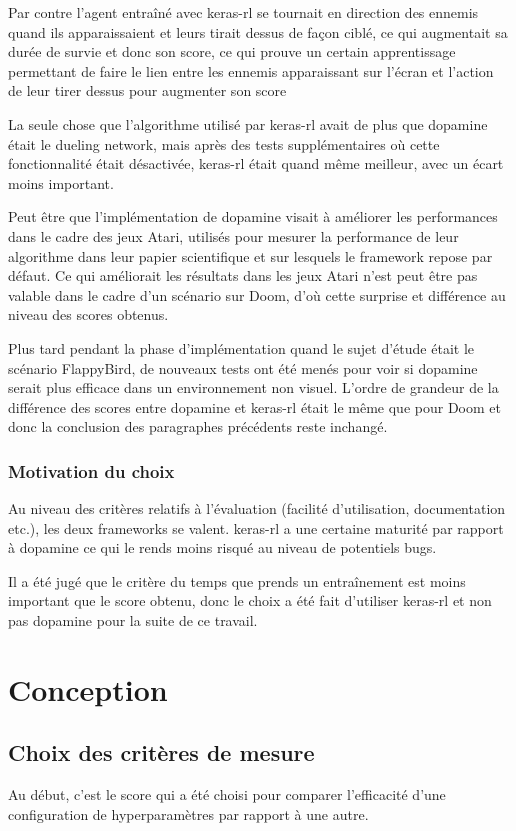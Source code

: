 \documentclass[a4paper,10pt,openany,oneside]{report}
\begin{document}
Par contre l'agent entraîné avec keras-rl se tournait en direction des ennemis quand ils apparaissaient et leurs tirait dessus de façon ciblé, ce qui augmentait sa durée de survie et donc son score, ce qui prouve un certain apprentissage permettant de faire le lien entre les ennemis apparaissant sur l'écran et l'action de leur tirer dessus pour augmenter son score

La seule chose que l'algorithme utilisé par keras-rl avait de plus que dopamine était le dueling network, mais après des tests supplémentaires où cette fonctionnalité était désactivée, keras-rl était quand même meilleur, avec un écart moins important.

Peut être que l'implémentation de dopamine visait à améliorer les performances dans le cadre des jeux Atari, utilisés pour mesurer la performance de leur algorithme dans leur papier scientifique et sur lesquels le framework repose par défaut. Ce qui améliorait les résultats dans les jeux Atari n'est peut être pas valable dans le cadre d'un scénario sur Doom, d'où cette surprise et différence au niveau des scores obtenus.

Plus tard pendant la phase d'implémentation quand le sujet d'étude était le scénario FlappyBird, de nouveaux tests ont été menés pour voir si dopamine serait plus efficace dans un environnement non visuel. L'ordre de grandeur de la différence des scores entre dopamine et keras-rl était le même que pour Doom et donc la conclusion des paragraphes précédents reste inchangé.

\subsection{Motivation du choix}
Au niveau des critères relatifs à l'évaluation (facilité d'utilisation, documentation etc.), les deux frameworks se valent. keras-rl a une certaine maturité par rapport à dopamine ce qui le rends moins risqué au niveau de potentiels bugs.

Il a été jugé que le critère du temps que prends un entraînement est moins important que le score obtenu, donc le choix a été fait d'utiliser keras-rl et non pas dopamine pour la suite de ce travail.
\chapter{Conception}
\thispagestyle{headings}

\section{Choix des critères de mesure}
Au début, c'est le score qui a été choisi pour comparer l'efficacité d'une configuration de hyperparamètres par rapport à une autre.
\end{document}

